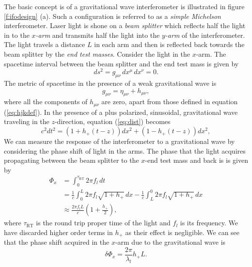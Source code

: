 The basic concept is of a gravitational wave interferometer is illustrated in
figure \ref{f:ifodesign} (a). Such a configuration is referred to as a
\emph{simple Michelson} interferometer. Laser light is shone on a \emph{beam
splitter} which reflects half the light in to the \emph{$x$-arm} and transmits
half the light into the \emph{$y$-arm} of the interferometer. The light
travels a distance $L$ in each arm and then is reflected back towards the beam
splitter by the \emph{end test masses}. Consider the light in the $x$-arm. The
spacetime interval between the beam splitter and the end test mass is given
by
\begin{equation}
ds^2 = g_{\mu\nu}\, dx^\mu\, dx^\nu = 0.
\label{eq:dist}
\end{equation}
The metric of spacetime in the presence of a weak gravitational wave is
\begin{equation}
g_{\mu\nu} = \eta_{\mu\nu} + h_{\mu\nu},
\end{equation}
where all the components of $h_{\mu\nu}$ are zero, apart from those defined
in equation (\ref{eq:hjkdef}). In the presence of a plus polarized,
sinusoidal, gravitational wave traveling in the $z$-direction, equation
(\ref{eq:dist}) becomes
\begin{equation}
c^2 dt^2 = \left(1 + h_{+}(t-z)\right) dx^2 + \left(1 - h_{+}(t-z)\right) dx^2,
\end{equation}
We can measure the response of the interferometer to a gravitational wave by
considering the phase shift of light in the arms. The phase that the light
acquires propagating between the beam splitter to the $x$-end test mass and
back is is given by\cite{Saulson:1994}
\begin{equation}
\begin{split}
\Phi_x &= \int_0^{\tau_\mathrm{RT}} 2\pi f_l\, dt \\
&= \frac{1}{c} \int_0^L 2\pi f_l \sqrt{1 + h_{+}}\,dx -
\frac{1}{c} \int_L^0 2\pi f_l \sqrt{1 + h_{+}}\,dx \\
&\approx \frac{2\pi f_l L}{c} \left(1 + \frac{h_{+}}{2}\right),
\end{split}
\end{equation}
where $\tau_\mathrm{RT}$ is the round trip proper time of the light and $f_l$ is
its frequency. We have discarded higher order terms in $h_+$ as their effect
is negligible.  We can see that the phase shift acquired in the $x$-arm due to the
gravitational wave is
\begin{equation}
\delta \Phi_x = \frac{2\pi}{\lambda_l} h_{+} L.
\end{equation}
